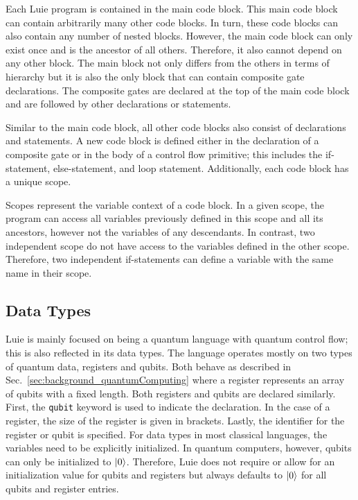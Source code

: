 Each Luie program is contained in the main code block. This main code block can contain arbitrarily many other code blocks. In turn, these code blocks can also contain any number of nested blocks. However, the main code block can only exist once and is the ancestor of all others. Therefore, it also cannot depend on any other block. The main block not only differs from the others in terms of hierarchy but it is also the only block that can contain composite gate declarations. The composite gates are declared at the top of the main code block and are followed by other declarations or statements. 

Similar to the main code block, all other code blocks also consist of declarations and statements. A new code block is defined either in the declaration of a composite gate or in the body of a control flow primitive; this includes the if-statement, else-statement, and loop statement. Additionally, each code block has a unique scope.

Scopes represent the variable context of a code block. In a given scope, the program can access all variables previously defined in this scope and all its ancestors, however not the variables of any descendants.  
In contrast, two independent scope do not have access to the variables defined in the other scope. Therefore, two independent if-statements can define a variable with the same name in their scope. 

\subsection{Data Types}
\label{sec:concept_dataTypes}
Luie is mainly focused on being a quantum language with quantum control flow; this is also reflected in its data types. The language operates mostly on two types of quantum data, registers and qubits. Both behave as described in Sec.~\ref{sec:background_quantumComputing} where a register represents an array of qubits with a fixed length.
Both registers and qubits are declared similarly. First, the \texttt{qubit} keyword is used to indicate the declaration. In the case of a register, the size of the register is given in brackets. Lastly, the identifier for the register or qubit is specified. For data types in most classical languages, the variables need to be explicitly initialized. In quantum computers, however, qubits can only be initialized to $\ket{0}$. Therefore, Luie does not require or allow for an initialization value for qubits and registers but always defaults to $\ket{0}$ for all qubits and register entries.

